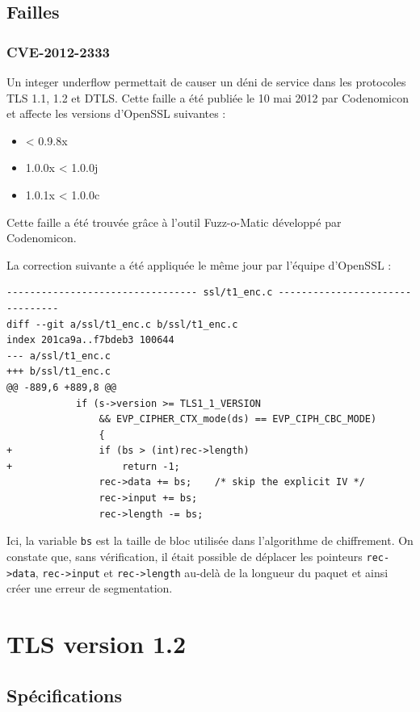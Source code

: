 \documentclass[a4paper,11pt,french]{article}
\begin{document}
\subsection{Failles}
\subsubsection{\label{CVE-2012-2333}CVE-2012-2333}

Un integer underflow permettait de causer un déni de service dans les protocoles TLS 1.1, 1.2 et DTLS. Cette faille a été publiée le 10 mai 2012 par Codenomicon et affecte les versions d'OpenSSL suivantes :
\begin{itemize}
\item < 0.9.8x
\item 1.0.0x < 1.0.0j
\item 1.0.1x < 1.0.0c
\end{itemize}

Cette faille a été trouvée grâce à l'outil Fuzz-o-Matic développé par Codenomicon.

La correction suivante a été appliquée le même jour par l'équipe d'OpenSSL :
\begin{Verbatim}
--------------------------------- ssl/t1_enc.c --------------------------------
diff --git a/ssl/t1_enc.c b/ssl/t1_enc.c
index 201ca9a..f7bdeb3 100644
--- a/ssl/t1_enc.c
+++ b/ssl/t1_enc.c
@@ -889,6 +889,8 @@
            if (s->version >= TLS1_1_VERSION
                && EVP_CIPHER_CTX_mode(ds) == EVP_CIPH_CBC_MODE)
                {
+               if (bs > (int)rec->length)
+                   return -1;
                rec->data += bs;    /* skip the explicit IV */
                rec->input += bs;
                rec->length -= bs;
\end{Verbatim}

Ici, la variable \verb+bs+ est la taille de bloc utilisée dans l'algorithme de chiffrement.
On constate que, sans vérification, il était possible de déplacer les pointeurs \verb+rec->data+, \verb+rec->input+ et \verb+rec->length+  au-delà de la longueur du paquet et ainsi créer une erreur de segmentation.


\pagebreak
\section{TLS version 1.2}
\subsection{Spécifications}
\end{document}
